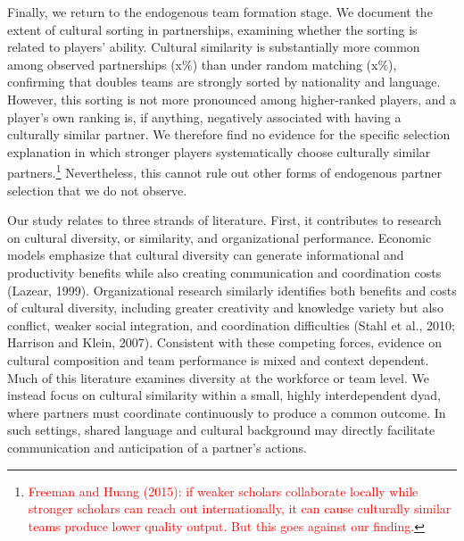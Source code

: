 \documentclass[10pt]{article}
\begin{document}
Finally, we return to the endogenous team formation stage. We document the extent of cultural sorting in partnerships, examining whether the sorting is related to  players' ability. Cultural similarity is substantially more common among observed partnerships (x\%) than under random matching (x\%), confirming that doubles teams are strongly sorted by nationality and language. However, this sorting is not more pronounced among higher-ranked players, and a player's own ranking is, if anything, negatively associated with having a culturally similar partner. We therefore find no evidence for the specific selection explanation in which stronger players systematically choose culturally similar partners.\footnote{\textcolor{red}{Freeman and Huang (2015): if weaker scholars collaborate locally while stronger scholars can reach out internationally, it can cause culturally similar teams produce lower quality output. But this goes against our finding.}} Nevertheless, this  cannot rule out other forms of endogenous partner selection that we do not observe.

Our study relates to three strands of literature. First, it contributes to research on cultural diversity, or similarity, and organizational performance. Economic models emphasize that cultural diversity can generate informational and productivity benefits while also creating communication and coordination costs (Lazear, 1999). Organizational research similarly identifies both benefits and costs of cultural diversity, including greater creativity and knowledge variety but also conflict, weaker social integration, and coordination difficulties (Stahl et al., 2010; Harrison and Klein, 2007). Consistent with these competing forces, evidence on cultural composition and team performance is mixed and context dependent. Much of this literature examines diversity at the workforce or team level. We instead focus on cultural similarity within a small, highly interdependent dyad, where partners must coordinate continuously to produce a common outcome. In such settings, shared language and cultural background may directly facilitate communication and anticipation of a partner’s actions.
\end{document}
